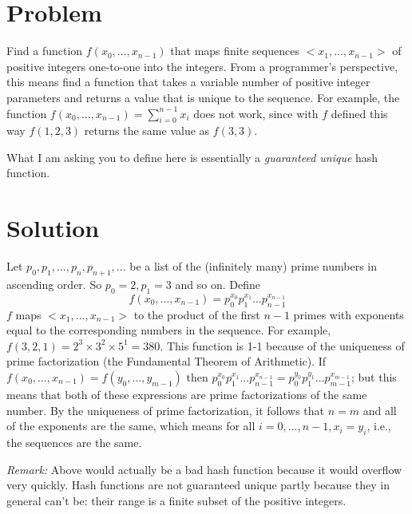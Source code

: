 \documentclass[11pt,a4paper]{report}
\theoremstyle{plain}
\theoremstyle{definition}
\theoremstyle{remark}
\begin{document}
\section*{Problem}
Find a function $f(x_0, ..., x_{n-1})$ that maps finite sequences $<x_1, ..., x_{n-1}>$ of positive integers one-to-one into the integers.  From a programmer's perspective, this means find a function that takes a variable number of positive integer parameters and returns a value that is unique to the sequence.  For example, the function $f(x_0, ..., x_{n-1}) = \sum_{i=0}^{n-1}{x_i}$ does not work, since with $f$ defined this way $f(1,2,3)$ returns the same value as $f(3,3)$.

What I am asking you to define here is essentially a \textit{guaranteed unique} hash function.

\section*{Solution}
Let $p_0, p_1, ..., p_n, p_{n+1}, ...$ be a list of the (infinitely many) prime numbers in ascending order.  So $p_0 = 2, p_1 = 3$ and so on.  Define 
$$f(x_0, ..., x_{n-1}) = p_0^{x_0}p_1^{x_1}...p_{n-1}^{x_{n-1}}$$
$f$ maps $<x_1, ..., x_{n-1}>$ to the product of the first $n-1$ primes with exponents equal to the corresponding numbers in the sequence.  For example, $f(3,2,1) = 2^{3} \times 3^{2} \times 5^{1} = 380.$
This function is 1-1 because of the uniqueness of prime factorization (the Fundamental Theorem of Arithmetic).  If $f(x_0, ..., x_{n-1}) = f(y_0, ..., y_{m-1})$ then $p_0^{x_0}p_1^{x_1}...p_{n-1}^{x_{n-1}} = p_0^{y_0}p_1^{y_1}...p_{m-1}^{x_{m-1}}$; but this means that both of these expressions are prime factorizations of the same number.  By the uniqueness of prime factorization, it follows that $n = m$ and all of the exponents are the same, which means for all $i = 0, ..., n-1, x_i = y_i$, i.e., the sequences are the same.

\textit{Remark:} Above would actually be a bad hash function because it would overflow very quickly. Hash functions are not guaranteed unique partly because they in general can't be: their range is a finite subset of the positive integers.
\end{document}
